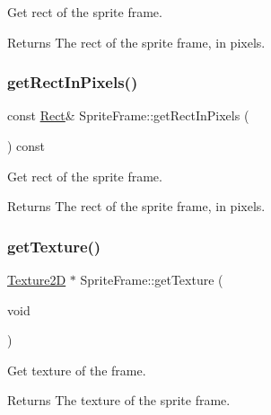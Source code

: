 Get rect of the sprite frame.

\begin{DoxyReturn}{Returns}
The rect of the sprite frame, in pixels. 
\end{DoxyReturn}
\mbox{\label{classSpriteFrame_a4fe04d5adcc732b7f8f772f3020a2af5}} 
\subsubsection{\texorpdfstring{get\+Rect\+In\+Pixels()}{getRectInPixels()}\hspace{0.1cm}{\footnotesize\ttfamily [2/2]}}
{\footnotesize\ttfamily const \hyperlink{classRect}{Rect}\& Sprite\+Frame\+::get\+Rect\+In\+Pixels (\begin{DoxyParamCaption}{ }\end{DoxyParamCaption}) const\hspace{0.3cm}{\ttfamily [inline]}}

Get rect of the sprite frame.

\begin{DoxyReturn}{Returns}
The rect of the sprite frame, in pixels. 
\end{DoxyReturn}
\mbox{\label{classSpriteFrame_a9f4d9c339580bab0ae2c8026b386a4ce}} 
\subsubsection{\texorpdfstring{get\+Texture()}{getTexture()}\hspace{0.1cm}{\footnotesize\ttfamily [1/2]}}
{\footnotesize\ttfamily \hyperlink{classTexture2D}{Texture2D} $\ast$ Sprite\+Frame\+::get\+Texture (\begin{DoxyParamCaption}\item[{void}]{ }\end{DoxyParamCaption})}

Get texture of the frame.

\begin{DoxyReturn}{Returns}
The texture of the sprite frame. 
\end{DoxyReturn}
\mbox{\label{classSpriteFrame_a5d6a0de7d4263f8ad0e3a568a7a10e06}} 
